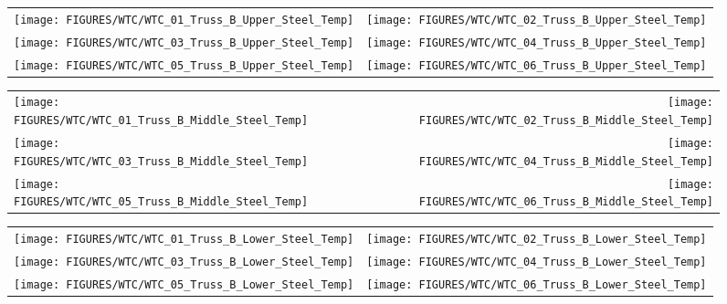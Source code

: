 \begin{figure}[p]
\begin{tabular*}{\textwidth}{l@{\extracolsep{\fill}}r}
\texttt{[image: FIGURES/WTC/WTC\_01\_Truss\_B\_Upper\_Steel\_Temp]} &
\texttt{[image: FIGURES/WTC/WTC\_02\_Truss\_B\_Upper\_Steel\_Temp]} \\
\texttt{[image: FIGURES/WTC/WTC\_03\_Truss\_B\_Upper\_Steel\_Temp]} &
\texttt{[image: FIGURES/WTC/WTC\_04\_Truss\_B\_Upper\_Steel\_Temp]} \\
\texttt{[image: FIGURES/WTC/WTC\_05\_Truss\_B\_Upper\_Steel\_Temp]} &
\texttt{[image: FIGURES/WTC/WTC\_06\_Truss\_B\_Upper\_Steel\_Temp]}
\end{tabular*}
\label{NIST_WTC_Truss_B_Upper_Steel_Temp}
\end{figure}

\begin{figure}[p]
\begin{tabular*}{\textwidth}{l@{\extracolsep{\fill}}r}
\texttt{[image: FIGURES/WTC/WTC\_01\_Truss\_B\_Middle\_Steel\_Temp]} &
\texttt{[image: FIGURES/WTC/WTC\_02\_Truss\_B\_Middle\_Steel\_Temp]} \\
\texttt{[image: FIGURES/WTC/WTC\_03\_Truss\_B\_Middle\_Steel\_Temp]} &
\texttt{[image: FIGURES/WTC/WTC\_04\_Truss\_B\_Middle\_Steel\_Temp]} \\
\texttt{[image: FIGURES/WTC/WTC\_05\_Truss\_B\_Middle\_Steel\_Temp]} &
\texttt{[image: FIGURES/WTC/WTC\_06\_Truss\_B\_Middle\_Steel\_Temp]}
\end{tabular*}
\label{NIST_WTC_Truss_B_Middle_Steel_Temp}
\end{figure}

\begin{figure}[p]
\begin{tabular*}{\textwidth}{l@{\extracolsep{\fill}}r}
\texttt{[image: FIGURES/WTC/WTC\_01\_Truss\_B\_Lower\_Steel\_Temp]} &
\texttt{[image: FIGURES/WTC/WTC\_02\_Truss\_B\_Lower\_Steel\_Temp]} \\
\texttt{[image: FIGURES/WTC/WTC\_03\_Truss\_B\_Lower\_Steel\_Temp]} &
\texttt{[image: FIGURES/WTC/WTC\_04\_Truss\_B\_Lower\_Steel\_Temp]} \\
\texttt{[image: FIGURES/WTC/WTC\_05\_Truss\_B\_Lower\_Steel\_Temp]} &
\texttt{[image: FIGURES/WTC/WTC\_06\_Truss\_B\_Lower\_Steel\_Temp]}
\end{tabular*}
\label{NIST_WTC_Truss_B_Lower_Steel_Temp}
\end{figure}


